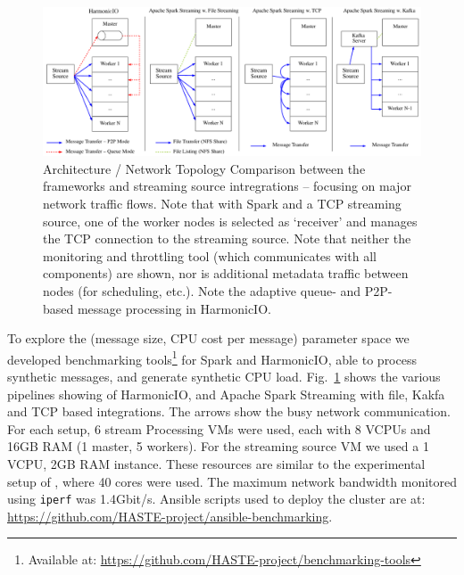 \documentclass[letterpaper,conference]{IEEEtran}
\begin{document}
\begin{figure}[h]
\includegraphics[width=\textwidth]{images/arch-comp-w-kafka}
\caption{Architecture / Network Topology Comparison between the frameworks and streaming source intregrations -- focusing on major network traffic flows. Note that with Spark and a TCP streaming source, one of the worker nodes is selected as `receiver' and manages the TCP connection to the streaming source. 
Note that neither the monitoring and throttling tool (which communicates with all components) are shown, nor is additional metadata traffic between nodes (for scheduling, etc.). Note the adaptive queue- and P2P-based message processing in HarmonicIO.}
\label{fig:arch-comp}
\end{figure}


To explore the (message size, CPU cost per message) parameter space we developed benchmarking tools\footnote{Available at: \url{https://github.com/HASTE-project/benchmarking-tools}} for Spark and HarmonicIO, able to process synthetic messages, and generate synthetic CPU load.
Fig.~\ref{fig:arch-comp} shows the various pipelines showing of HarmonicIO, and Apache Spark Streaming with file, Kakfa and TCP based integrations. The arrows show the busy network communication.
For each setup, 6 stream Processing VMs were used, each with 8 VCPUs and 16GB RAM (1 master, 5 workers). For the streaming source VM we used a 1 VCPU, 2GB RAM instance.  
These resources are similar to the experimental setup of \cite{xinApacheSparkFastest2014}, where 40 cores were used.
The maximum network bandwidth monitored using \texttt{iperf} was 1.4Gbit/s. 
Ansible scripts used to deploy the cluster are at: \url{https://github.com/HASTE-project/ansible-benchmarking}.
\end{document}
